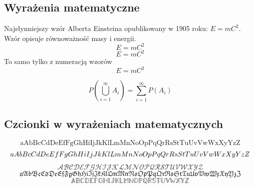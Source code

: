 \subsection{Wyrażenia matematyczne}
Najsłynniejszy wzór Alberta Einsteina opublikowany w 1905 roku: \(E=mC^{2}\). 
Wzór opisuje równoważność masy i energii.
\[ E=mC^{2} \]
\begin{displaymath}E=mC^{2}\end{displaymath}
To samo tylko z numeracją wzorów
\begin{equation}E=mC^{2}\end{equation}

\begin{equation}P\left(\bigcup_{i=1}^{\infty}{A_i} \right)=\sum_{i=1}^{\infty}{P(A_i)}\end{equation}

\subsection{Czcionki w wyrażeniach matematycznych}
\noindent
\[ \mathrm{aAbBcCdDeEfFgGhHiIjJkKlLmMnNoOpPqQrRsStTuUvVwWxXyYzZ} \]
\[ \mathnormal{aAbBcCdDeEfFgGhHiIjJkKlLmMnNoOpPqQrRsStTuUvVwWxXyYzZ} \]
\[ \mathcal{ABCDEFGHIJKLMNOPQRSTUVWXYZ} \]
\[ \mathfrak{aAbBcCdDeEfFgGhHiIjJkKlLmMnNoOpPqQrRsStTuUvVwWxXyYzZ} \]
\[ \mathbb{ABCDEFGHIJKLMNOPQRSTUVWXYZ} \]

